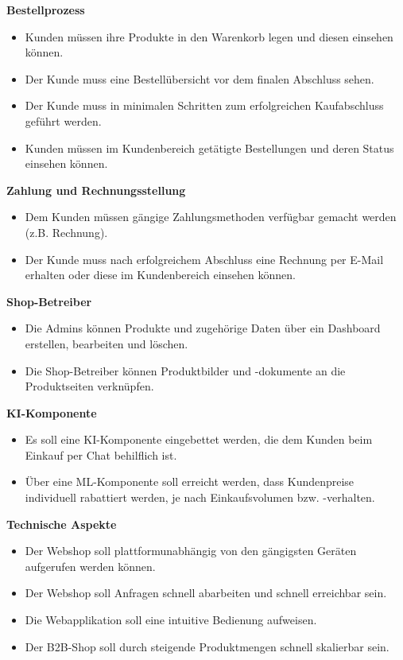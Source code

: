 \documentclass[%
	ngerman,
	12pt,
	a4paper,
	oneside,
	parskip=full
]{scrbook}
\begin{document}
	\vspace{0.5cm}
	\textbf{Bestellprozess}
	\begin{itemize}
		\item Kunden müssen ihre Produkte in den Warenkorb legen und diesen einsehen können.
		\item Der Kunde muss eine Bestellübersicht vor dem finalen Abschluss sehen.
		\item Der Kunde muss in minimalen Schritten zum erfolgreichen Kaufabschluss geführt werden.
		\item Kunden müssen im Kundenbereich getätigte Bestellungen und deren Status einsehen können.
	\end{itemize}

	\vspace{0.5cm}
	\textbf{Zahlung und Rechnungsstellung}
	\begin{itemize}
		\item Dem Kunden müssen gängige Zahlungsmethoden verfügbar gemacht werden (z.B. Rechnung).
		\item Der Kunde muss nach erfolgreichem Abschluss eine Rechnung per E-Mail erhalten oder diese im Kundenbereich einsehen können.
	\end{itemize}

	\vspace{0.5cm}
	\textbf{Shop-Betreiber}
	\begin{itemize}
		\item Die Admins können Produkte und zugehörige Daten über ein Dashboard erstellen, bearbeiten und löschen.
		\item Die Shop-Betreiber können Produktbilder und -dokumente an die Produktseiten verknüpfen.
	\end{itemize}

	\vspace{0.5cm}
	\textbf{KI-Komponente}
	\begin{itemize}
		\item Es soll eine KI-Komponente eingebettet werden, die dem Kunden beim Einkauf per Chat behilflich ist.
		\item Über eine ML-Komponente soll erreicht werden, dass Kundenpreise individuell rabattiert werden, je nach Einkaufsvolumen bzw. -verhalten.
	\end{itemize}

	\vspace{0.5cm}
	\textbf{Technische Aspekte}
	\begin{itemize}
		\item Der Webshop soll plattformunabhängig von den gängigsten Geräten aufgerufen werden können.
		\item Der Webshop soll Anfragen schnell abarbeiten und schnell erreichbar sein.
		\item Die Webapplikation soll eine intuitive Bedienung aufweisen.
		\item Der B2B-Shop soll durch steigende Produktmengen schnell skalierbar sein.
	\end{itemize}
\end{document}

